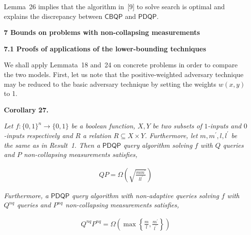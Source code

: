 


Lemma 26 implies that the algorithm in [9] to solve search is optimal and explains the discrepancy between $\mathsf{CBQP}$ and $\mathsf{PDQP}$.\par







\par\medskip\noindent\textbf{
7 Bounds on problems with non-collapsing measurements}\par




\par\medskip\noindent\textbf{
7.1 Proofs of applications of the lower-bounding techniques}\par




We shall apply Lemmata 18 and 24 on concrete problems in order to compare the two models. First, let us note that the positive-weighted adversary technique may be reduced to the basic adversary technique by setting the weights $w(x,y)$ to 1.\par





\par\medskip\noindent\textbf{
\textbf{Corollary 27}\textbf{.}
}\par



\emph{Let $f:\{0,1\}^{n}\rightarrow\{0,1\}$ be a boolean function, $X,Y$ be two subsets of $1$-inputs and $0$-inputs respectively and $R$ a relation $R\subseteq X\times Y$. Furthermore, let $m,m^{\prime},l,l^{\prime}$ be the same as in Result 1. Then a $\mathsf{PDQP}$ query algorithm solving $f$ with $Q$ queries and $P$ non-collapsing measurements satisfies,}\par


\[\begin{gathered}
\displaystyle QP=\Omega\left(\sqrt{\frac{mm^{\prime}}{ll^{\prime}}}\right)
\end{gathered}\]


\emph{Furthermore, a $\mathsf{PDQP}$ query algorithm with non-adaptive queries solving $f$ with $Q^{nq}$ queries and $P^{nq}$ non-collapsing measurements satisfies,}\par


\[\begin{gathered}
\displaystyle Q^{nq}P^{nq}=\Omega\left(\max\left\{\frac{m}{l},\frac{m^{\prime}}{l^{\prime}}\right\}\right)
\end{gathered}\]



